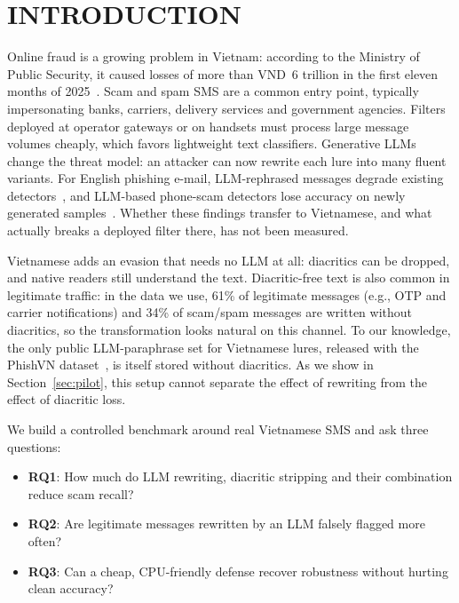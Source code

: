 \documentclass[11pt,a4paper]{article}
\begin{document}
\section{INTRODUCTION}
Online fraud is a growing problem in Vietnam: according to the Ministry of Public Security, it caused losses of more than VND~6 trillion in the first eleven months of 2025~\cite{sggp2026scamlosses}. Scam and spam SMS are a common entry point, typically impersonating banks, carriers, delivery services and government agencies.
Filters deployed at operator gateways or on handsets must process large message volumes cheaply, which favors lightweight text classifiers. Generative LLMs change the threat model: an attacker can now rewrite each lure into many fluent variants. For English phishing e-mail, LLM-rephrased messages degrade existing detectors~\cite{afane2024nextgen}, and LLM-based phone-scam detectors lose accuracy on newly generated samples~\cite{shen2024phonescam}. Whether these findings transfer to Vietnamese, and what actually breaks a deployed filter there, has not been measured.

Vietnamese adds an evasion that needs no LLM at all: diacritics can be dropped, and native readers still understand the text. Diacritic-free text is also common in legitimate traffic: in the data we use, 61\% of legitimate messages (e.g., OTP and carrier notifications) and 34\% of scam/spam messages are written without diacritics, so the transformation looks natural on this channel. To our knowledge, the only public LLM-paraphrase set for Vietnamese lures, released with the PhishVN dataset~\cite{vu2026phishvn}, is itself stored without diacritics. As we show in Section~\ref{sec:pilot}, this setup cannot separate the effect of rewriting from the effect of diacritic loss.

We build a controlled benchmark around real Vietnamese SMS and ask three questions:
\begin{itemize}
\item \textbf{RQ1}: How much do LLM rewriting, diacritic stripping and their combination reduce scam recall?
\item \textbf{RQ2}: Are legitimate messages rewritten by an LLM falsely flagged more often?
\item \textbf{RQ3}: Can a cheap, CPU-friendly defense recover robustness without hurting clean accuracy?
\end{itemize}
\end{document}
